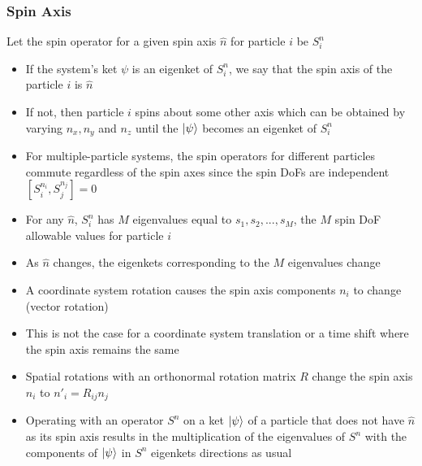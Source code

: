 \documentclass[8pt,t,mathserif,aspectratio=169]{beamer}
\begin{document}
\begin{frame}
  \frametitle{Spin Axis}
  \vspace{1mm}
  Let the spin operator for a given spin axis $\hat{n}$ for particle $i$ be $S^n_i$
  \begin{itemize}
    \item If the system's ket $\psi$ is an eigenket of $S^n_i$, we say that the spin axis of the particle $i$ is $\hat{n}$
    \item If not, then particle $i$ spins about some other axis which can be obtained by varying $n_x,n_y$ and $n_z$ until the $\ket{\psi}$ becomes an eigenket of $S^n_i$ 
    \item For multiple-particle systems, the spin operators for different particles commute regardless of the spin axes since the spin DoFs are independent $[S^{n_i}_i,S^{n_j}_j] = 0$
    \item For any $\hat{n}$, $S^n_i$ has $M$ eigenvalues equal to $s_1,s_2,...,s_M$, the $M$ spin DoF allowable values for particle $i$
    \item As $\hat{n}$ changes, the eigenkets corresponding to the $M$ eigenvalues change 
    \item A coordinate system rotation causes the spin axis components $n_i$ to change (vector rotation)
    \item This is not the case for a coordinate system translation or a time shift where the spin axis remains the same
    \item Spatial rotations with an orthonormal rotation matrix $R$ change the spin axis $n_i$ to $n'_i = R_{ij} n_j$
    \item Operating with an operator $S^n$ on a ket $\ket{\psi}$ of a particle that does not have $\hat{n}$ as its spin axis results in the multiplication of the eigenvalues of $S^n$ with the components of $\ket{\psi}$ in $S^n$ eigenkets directions as usual
  \end{itemize}
\end{frame}
\end{document}
